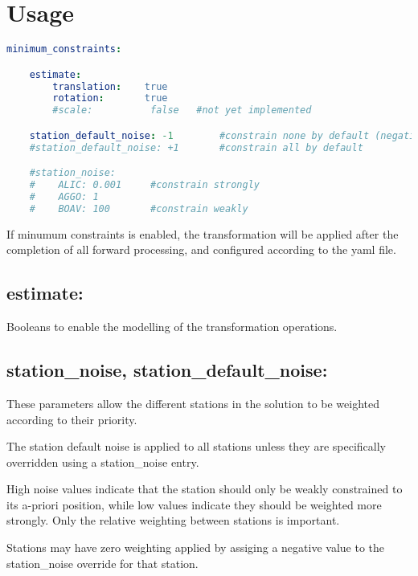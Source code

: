 \section{Usage} \label{MinConConfig}


\begin{lstlisting}[language=yaml,caption=Minimum Constraints Configuration]
minimum_constraints:

    estimate:
        translation:    true
        rotation:       true
        #scale:          false   #not yet implemented

    station_default_noise: -1        #constrain none by default (negative numbers are not constrained)
    #station_default_noise: +1       #constrain all by default

    #station_noise:
    #    ALIC: 0.001     #constrain strongly
    #    AGGO: 1
    #    BOAV: 100       #constrain weakly
\end{lstlisting}

If minumum constraints is enabled, the transformation will be applied after the completion of all forward processing, and configured according to the yaml file.

\subsection*{estimate:}

Booleans to enable the modelling of the transformation operations.

\subsection*{station\_noise, station\_default\_noise:}

These parameters allow the different stations in the solution to be weighted according to their priority.

The station default noise is applied to all stations unless they are specifically overridden using a station\_noise entry.

High noise values indicate that the station should only be weakly constrained to its a-priori position, while low values indicate they should be weighted more strongly. Only the relative weighting between stations is important.

Stations may have zero weighting applied by assiging a negative value to the station\_noise override for that station.

